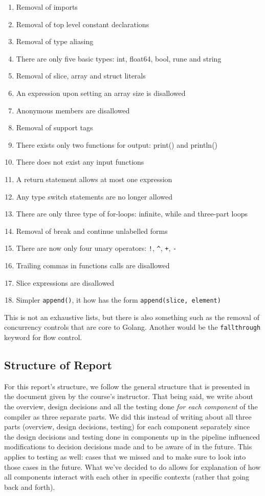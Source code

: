 \documentclass{article}
\begin{document}
\begin{enumerate}
    \item Removal of imports
    \item Removal of top level constant declarations
    \item Removal of type aliasing
    \item There are only five basic types: int, float64, bool, rune and string
    \item Removal of slice, array and struct literals
    \item An expression upon setting an array size is disallowed
    \item Anonymous members are disallowed
    \item Removal of support tags
    \item There exists only two functions for output: print() and println()
    \item There does not exist any input functions
    \item A return statement allows at most one expression
    \item Any type switch statements are no longer allowed
    \item There are only three type of for-loops: infinite, while and three-part loops
    \item Removal of break and continue unlabelled forms
    \item There are now only four unary operators: \verb|!|, \verb|^|, \verb|+|, \verb|-|
    \item Trailing commas in functions calls are disallowed
    \item Slice expressions are disallowed
    \item Simpler \texttt{append()}, it how has the form \texttt{append(slice, element)}
\end{enumerate}

This is not an exhaustive lists, but there is also something such as the removal of concurrency controls that are core to Golang. Another would be the \texttt{fallthrough} keyword for flow control.

\subsection{Structure of Report}

For this report's structure, we follow the general structure that is presented in the document given by the course's instructor. That being said, we write about the overview, design decisions and all the testing done \textit{for each component} of the compiler as three separate parts. We did this instead of writing about all three parts (overview, design decisions, testing) for each component separately since the design decisions and testing done in components up in the pipeline influenced modifications to decision decisions made and to be aware of in the future. This applies to testing as well: cases that we missed and to make sure to look into those cases in the future. What we've decided to do allows for explanation of how all components interact with each other in specific contexts (rather that going back and forth).
\end{document}
